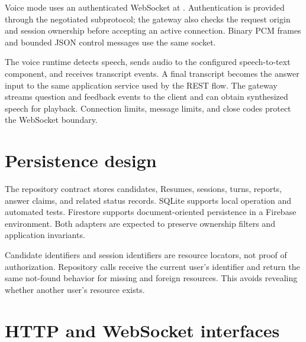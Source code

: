 Voice mode uses an authenticated WebSocket at . Authentication is provided through the negotiated subprotocol; the gateway also checks the request origin and session ownership before accepting an active connection. Binary PCM frames and bounded JSON control messages use the same socket.


The voice runtime detects speech, sends audio to the configured speech-to-text component, and receives transcript events. A final transcript becomes the answer input to the same application service used by the REST flow. The gateway streams question and feedback events to the client and can obtain synthesized speech for playback. Connection limits, message limits, and close codes protect the WebSocket boundary.

\section{Persistence design}

The repository contract stores candidates, Resumes, sessions, turns, reports, answer claims, and related status records. SQLite supports local operation and automated tests. Firestore supports document-oriented persistence in a Firebase environment. Both adapters are expected to preserve ownership filters and application invariants.


Candidate identifiers and session identifiers are resource locators, not proof of authorization. Repository calls receive the current user's identifier and return the same not-found behavior for missing and foreign resources. This avoids revealing whether another user's resource exists.

\section{HTTP and WebSocket interfaces}


